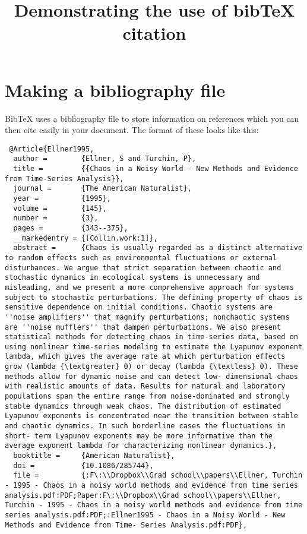 \documentclass[11pt,a4paper]{article}
\title{Demonstrating the use of bibTeX citation}
\begin{document}
\maketitle
\section{Making a bibliography file}
BibTeX uses a bibliography file to store information on references which you can then cite easily in your document. The format of these looks like this:

\begin{verbatim}
 @Article{Ellner1995,
  author =        {Ellner, S and Turchin, P},
  title =         {{Chaos in a Noisy World - New Methods and Evidence from Time-Series Analysis}},
  journal =       {The American Naturalist},
  year =          {1995},
  volume =        {145},
  number =        {3},
  pages =         {343--375},
  __markedentry = {[Collin.work:1]},
  abstract =      {Chaos is usually regarded as a distinct alternative to random effects such as environmental fluctuations or external disturbances. We argue that strict separation between chaotic and stochastic dynamics in ecological systems is unnecessary and misleading, and we present a more comprehensive approach for systems subject to stochastic perturbations. The defining property of chaos is sensitive dependence on initial conditions. Chaotic systems are ''noise amplifiers'' that magnify perturbations; nonchaotic systems are ''noise mufflers'' that dampen perturbations. We also present statistical methods for detecting chaos in time-series data, based on using nonlinear time-series modeling to estimate the Lyapunov exponent lambda, which gives the average rate at which perturbation effects grow (lambda {\textgreater} 0) or decay (lambda {\textless} 0). These methods allow for dynamic noise and can detect low- dimensional chaos with realistic amounts of data. Results for natural and laboratory populations span the entire range from noise-dominated and strongly stable dynamics through weak chaos. The distribution of estimated Lyapunov exponents is concentrated near the transition between stable and chaotic dynamics. In such borderline cases the fluctuations in short- term Lyapunov exponents may be more informative than the average exponent lambda for characterizing nonlinear dynamics.},
  booktitle =     {American Naturalist},
  doi =           {10.1086/285744},
  file =          {:F\:\\Dropbox\\Grad school\\papers\\Ellner, Turchin - 1995 - Chaos in a noisy world methods and evidence from time series analysis.pdf:PDF;Paper:F\:\\Dropbox\\Grad school\\papers\\Ellner, Turchin - 1995 - Chaos in a noisy world methods and evidence from time series analysis.pdf:PDF;:Ellner1995 - Chaos in a Noisy World - New Methods and Evidence from Time- Series Analysis.pdf:PDF},

\end{verbatim}
\end{document}
